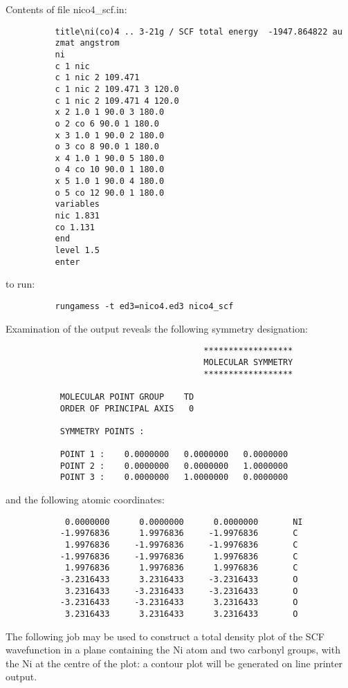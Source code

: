 \documentclass[11pt,fleqn]{article}
\begin{document}
Contents of file nico4\_scf.in:
{
\footnotesize
\begin{verbatim}
          title\ni(co)4 .. 3-21g / SCF total energy  -1947.864822 au 
          zmat angstrom
          ni
          c 1 nic
          c 1 nic 2 109.471
          c 1 nic 2 109.471 3 120.0
          c 1 nic 2 109.471 4 120.0
          x 2 1.0 1 90.0 3 180.0
          o 2 co 6 90.0 1 180.0
          x 3 1.0 1 90.0 2 180.0
          o 3 co 8 90.0 1 180.0
          x 4 1.0 1 90.0 5 180.0
          o 4 co 10 90.0 1 180.0
          x 5 1.0 1 90.0 4 180.0
          o 5 co 12 90.0 1 180.0
          variables
          nic 1.831
          co 1.131
          end
          level 1.5
          enter
\end{verbatim}
}
to run:
{
\footnotesize
\begin{verbatim}
          rungamess -t ed3=nico4.ed3 nico4_scf
\end{verbatim}
}
Examination of the output reveals the following symmetry
designation:
{
\footnotesize
\begin{verbatim}
                                        ******************
                                        MOLECULAR SYMMETRY
                                        ******************

           MOLECULAR POINT GROUP    TD      
           ORDER OF PRINCIPAL AXIS   0

           SYMMETRY POINTS :
          
           POINT 1 :    0.0000000   0.0000000   0.0000000
           POINT 2 :    0.0000000   0.0000000   1.0000000
           POINT 3 :    0.0000000   1.0000000   0.0000000
\end{verbatim}
}
and the following atomic coordinates:
{
\footnotesize
\begin{verbatim}
            0.0000000      0.0000000      0.0000000       NI
           -1.9976836      1.9976836     -1.9976836       C
            1.9976836     -1.9976836     -1.9976836       C 
           -1.9976836     -1.9976836      1.9976836       C 
            1.9976836      1.9976836      1.9976836       C 
           -3.2316433      3.2316433     -3.2316433       O
            3.2316433     -3.2316433     -3.2316433       O
           -3.2316433     -3.2316433      3.2316433       O
            3.2316433      3.2316433      3.2316433       O
\end{verbatim}
}
The following job may be used to construct a total density
plot of the SCF wavefunction in a plane containing
the Ni atom and two carbonyl groups, with the Ni at the
centre of the plot:
a contour plot will be generated on line printer output.
\end{document}
